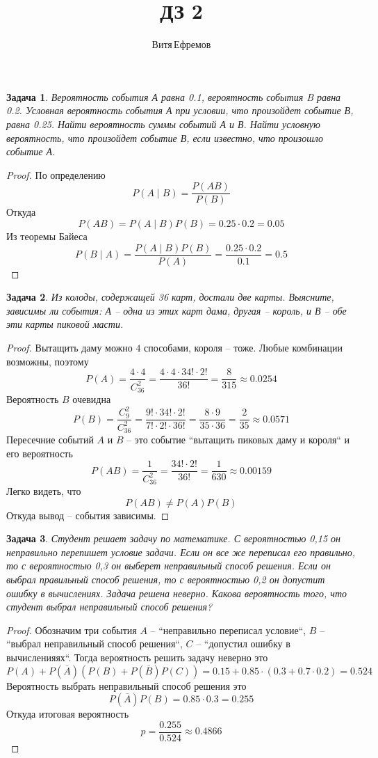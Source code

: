 \documentclass[a4paper,12pt]{article}
\newtheorem{problem}{Задача}
\newenvironment{solution}{\renewcommand{\proofname}{\unskip\indent\nopunct}\begin{proof}}{\end{proof}}
\begin{document}
\title{ДЗ 2}
\author{Витя\,Ефремов}
\maketitle

\begin{problem}
Вероятность события А равна 0.1, вероятность события B равна 0.2.
Условная вероятность события А при условии, что произойдет событие В, равна 0.25.
Найти вероятность суммы событий А и В.
Найти условную вероятность, что произойдет событие В, если известно, что произошло событие А.
\end{problem}
\begin{solution}
По определению
$$P(A \mid B) = \frac{P(AB)}{P(B)}$$
Откуда
$$P(A B) = P(A \mid B) P(B) = 0.25 \cdot 0.2 = 0.05$$
Из теоремы Байеса
$$P(B \mid A) = \frac{P(A \mid B) P(B)}{P(A)} = \frac{0.25 \cdot 0.2}{0.1} = 0.5$$
\end{solution}

\begin{problem}
Из колоды, содержащей 36 карт, достали две карты.
Выясните, зависимы ли события: А – одна из этих карт дама, другая – король, и В – обе эти карты пиковой масти.
\end{problem}
\begin{solution}
Вытащить даму можно $4$ способами, короля -- тоже. Любые комбинации возможны, поэтому
$$P(A) = \frac{4 \cdot 4}{C_{36}^{2}} = \frac{4 \cdot 4 \cdot 34! \cdot 2!}{36!} = \frac{8}{315} \approx 0.0254$$
Вероятность $B$ очевидна
$$P(B) = \frac{C_{9}^{2}}{C_{36}^{2}} = \frac{9! \cdot 34! \cdot 2!}{7! \cdot 2! \cdot 36!} = \frac{8 \cdot 9}{35 \cdot 36} = \frac{2}{35} \approx 0.0571$$
Пересечние событий $A$ и $B$ -- это событие ``вытащить пиковых даму и короля`` и его вероятность
$$P(AB) = \frac{1}{C_{36}^2} = \frac{34! \cdot 2!}{36!} = \frac{1}{630} \approx 0.00159$$
Легко видеть, что
$$P(AB) \neq P(A) P(B)$$
Откуда вывод -- события зависимы.
\end{solution}

\begin{problem}
Студент решает задачу по математике.
С вероятностью 0,15 он неправильно перепишет условие задачи.
Если он все же переписал его правильно, то с вероятностью 0,3 он выберет неправильный способ решения.
Если он выбрал правильный способ решения, то с вероятностью 0,2 он допустит ошибку в вычислениях.
Задача решена неверно.
Какова вероятность того, что студент выбрал неправильный способ решения?
\end{problem}
\begin{solution}
Обозначим три события $A$ -- ``неправильно переписал условие``, $B$ -- ``выбрал неправильный способ решения``, $C$ -- ``допустил ошибку в вычисленияях``.
Тогда вероятность решить задачу неверно это
$$P(A) + P(\overline{A})\left(P(B) + P(\overline{B}) P(C) \right) = 0.15 + 0.85 \cdot (0.3 + 0.7 \cdot 0.2) = 0.524$$
Вероятность выбрать неправильный способ решения это
$$P(\overline{A}) P(B) = 0.85 \cdot 0.3 = 0.255$$
Откуда итоговая вероятность
$$p = \frac{0.255}{0.524} \approx 0.4866$$
\end{solution}
\end{document}
